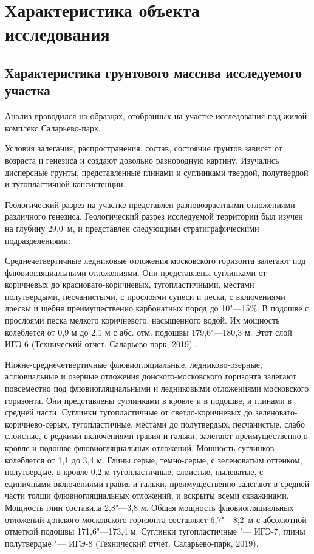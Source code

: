 \chapter{Характеристика объекта исследования}
\section{Характеристика грунтового массива исследуемого участка}
Анализ проводился на образцах, отобранных на участке исследования  под жилой комплекс Саларьево-парк.

Условия залегания, распространения, состав, состояние  грунтов зависят от возраста и генезиса и создают довольно разнородную картину. Изучались дисперсные грунты, представленные глинами и суглинками твердой, полутвердой и тугопластичной консистенции.


Геологический разрез на участке представлен разновозрастными отложениями различного генезиса.
Геологический разрез исследуемой территории был изучен на глубину 29,0~м, и представлен следующими стратиграфическими подразделениями:

 Среднечетвертичные ледниковые отложения московского горизонта  залегают под флювиогляциальными отложениями. Они представлены суглинками от коричневых до красновато-коричневых, тугопластичными, местами полутвердыми, песчанистыми, с прослоями супеси и песка, с включениями дресвы и щебня преимущественно карбонатных пород до 10"---15\%. В подошве с прослоями песка мелкого коричневого, насыщенного водой. Их мощность колеблется от 0,9 м до 2,1 м с абс. отм. подошвы 179,6"---180,3 м. Этот слой ИГЭ-6 (Технический отчет. Саларьево-парк, 2019) \cite{moshkin2019}.

Нижне-среднечетвертичные флювиогляциальные, ледниково-озерные, аллювиальные и озерные отложения донского-московского горизонта  залегают повсеместно под флювиогляциальными и ледниковыми отложениями московского горизонта. Они представлены суглинками в кровле и в подошве, и глинами в средней части. Суглинки тугопластичные от светло-коричневых до зеленовато-коричнево-серых, тугопластичные, местами до полутвердых, песчанистые, слабо слоистые, с редкими включениями гравия и гальки, залегают преимущественно в кровле и подошве флювиогляциальных отложений. Мощность суглинков колеблется от 1,1 до 3,4 м. Глины серые, темно-серые, с зеленоватым оттенком, полутвердые, в кровле 0,2 м тугопластичные, слоистые, пылеватые, с единичными включениями гравия и гальки, преимущественно залегают в средней части толщи флювиогляциальных отложений, и вскрыты всеми скважинами. Мощность глин составила 2,8"---3,8 м. Общая мощность флювиогляциальных отложений донского-московского горизонта составляет 6,7"---8,2~м с абсолютной отметкой подошвы 171,6"---173,4 м. Суглинки тугопластичные "--- ИГЭ-7, глины полутвердые "--- ИГЭ-8 (Технический отчет. Саларьево-парк, 2019).

